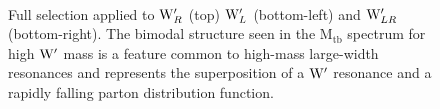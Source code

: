\begin{figure}[htcb]
\begin{center}
\\
\caption{
Full selection applied to $\mathrm{W}^\prime_{R}$ (top) $\mathrm{W}^\prime_{L}$ (bottom-left) and $\mathrm{W}^\prime_{LR}$ (bottom-right).  The bimodal structure seen in the $\mathrm{M_{tb}}$ spectrum for high $\mathrm{W}^\prime$ mass is a feature common to high-mass large-width resonances and represents the superposition of a $\mathrm{W}^\prime$ resonance and a rapidly falling parton distribution function. 
}
\label{figs:GCFS}
\end{center}
\end{figure}


\clearpage
